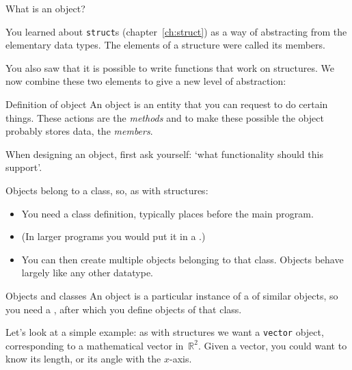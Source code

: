 
 {What is an object?}
\label{sec:object}

You learned about \lstinline{struct}s (chapter~\ref{ch:struct}) as a way of
abstracting from the elementary data types. The elements of a
structure were called its members.

You also saw that it is possible to write
functions that work on structures. We now combine these two elements
to give a new level of abstraction:

\begin{block}{Definition of object}
  \label{sl:object-def}
  An object is an entity that you can request to do certain
  things. These actions are the
  \emph{methods}
  and to make these possible the object probably stores
  data, the
  \emph{members}.

  When designing an object, first ask yourself: `what functionality
  should this support'.

\end{block}

Objects belong to a class, so, as with structures:
\begin{itemize}
\item You need a class definition, typically places before the main
  program.
\item (In larger programs you would put it in a
  .)
\item You can then create multiple objects belonging to that
  class. Objects behave largely like any other datatype.
\end{itemize}

\begin{slide}{Objects and classes}
  \label{label:class-def}
  An object is a particular instance of a  of
  similar objects, so you need a ,
  after which you define objects of that class.
\end{slide}

Let's look at a simple example: as with structures we want a
\lstinline{vector} object, corresponding to a mathematical vector
in~$\mathbb{R}^2$. Given a vector, you could want to know its length, or its
angle with the $x$-axis.

